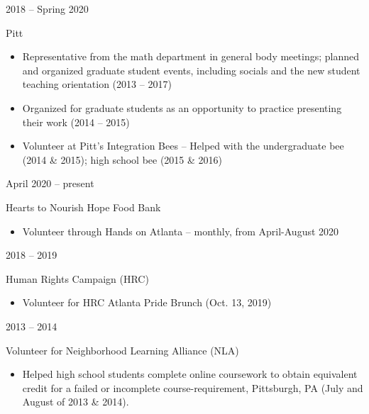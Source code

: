\documentclass[a4paper,10pt]{article}
\newlength{\cvcolumngapwidth}
\newlength{\cvleftcolumnwidth}
\newlength{\cvrightcolumnwidth}
\newcommand{\cvtitlestyle}[1]{{\large\cvtitlefont\textcolor{cvtitlecolor}{#1}}}
\newcommand{\cvheadingstyle}[1]{{\normalsize\cvheadingfont\textcolor{cvheadingcolor}{#1}}}
\newlength{\cvafteritemskipamount}
\newlength{\cvaftertitleskipamount}
\newlength{\cvparskip}
\newcommand{\cvitem}[2]{
            \begin{minipage}[t]{\cvleftcolumnwidth}
                \raggedleft #1
            \end{minipage}%
            \hspace{\cvcolumngapwidth}%
            \begin{minipage}[t]{\cvrightcolumnwidth}
                \setlength{\parskip}{\cvparskip} #2
            \end{minipage}
        
            \vspace{\cvafteritemskipamount}
        }
\newcommand{\cvtitle}[1]{
            \cvtitlestyle{#1}
        
            \vspace{\cvaftertitleskipamount}
            \vspace{-\cvparskip}
        }
\begin{document}
        
            
        \cvitem{
            \cvheadingstyle{2018 -- Spring 2020}
        }{
            \cvtitle{Pitt}
        
            \begin{itemize}[leftmargin=*]
    	\item Representative from the math department in general body meetings; planned and organized graduate student events, including socials and the new student teaching orientation (2013 -- 2017)
    	\item Organized for graduate students as an opportunity to practice presenting their work (2014 -- 2015)
    	\item Volunteer at Pitt's Integration Bees -- Helped with the undergraduate bee (2014 \& 2015); high school bee (2015 \& 2016)
        
            \end{itemize}
        
        }
        
        
          \cvitem{
            \cvheadingstyle{April 2020 -- present}
        }{
            \cvtitle{Hearts to Nourish Hope Food Bank}
        
            \begin{itemize}[leftmargin=*]
            	\item  Volunteer through Hands on Atlanta -- monthly, from April-August 2020
        
            \end{itemize}
        
        }
        
        
        \cvitem{
            \cvheadingstyle{2018 -- 2019}
        }{
            \cvtitle{Human Rights Campaign (HRC)}
        
            \begin{itemize}[leftmargin=*]
            	\item Volunteer for HRC Atlanta Pride Brunch (Oct. 13, 2019)
        
            \end{itemize}
        
        }
        
          \cvitem{
            \cvheadingstyle{2013 -- 2014}
        }{
            \cvtitle{Volunteer for Neighborhood Learning Alliance (NLA)}
            \begin{itemize}[leftmargin=*]
               	\item Helped high school students complete online coursework to obtain equivalent
        credit for a failed or incomplete course-requirement, Pittsburgh, PA (July and August of 2013 \& 2014).
            \end{itemize}  
        }
        
\end{document}
